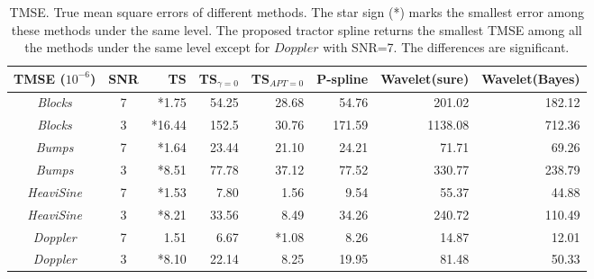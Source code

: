 \begin{table}
	\centering
	\caption{TMSE. True mean square errors of different methods. The star sign (*) marks the smallest error among these methods under the same level. The proposed tractor spline returns the smallest TMSE among all the methods under the same level except for $\mathit{Doppler}$ with SNR=7. The differences are significant. }\label{tmse3200}
	\setlength\tabcolsep{1.5pt}
	\begin{tabular}{|c|c|r|r|r|r|r|r|}
\hline	TMSE ($10^{-6}$)  & SNR & TS & TS$_{\gamma=0}$ & TS$_{APT=0}$  & P-spline & Wavelet(sure) & Wavelet(Bayes)\\ \hline
		\textit{Blocks}    & 7   &*1.75 & 54.25 &  28.68   & 54.76   & 201.02   & 182.12   \\ \hline
		\textit{Blocks}    & 3   & *16.44& 152.5 & 30.76  & 171.59   & 1138.08  & 712.36  \\ \hline
		\textit{Bumps}     & 7   &*1.64 & 23.44  & 21.10     & 24.21 & 71.71 & 69.26 \\ \hline
		\textit{Bumps}     & 3   &*8.51 & 77.78  &37.12     & 77.52 & 330.77 & 238.79 \\ \hline
		\textit{HeaviSine} & 7   &*1.53& 7.80  & 1.56     & 9.54   & 55.37  &44.88  \\ \hline
		\textit{HeaviSine} & 3   & *8.21& 33.56  & 8.49 & 34.26 & 240.72& 110.49\\ \hline
		\textit{Doppler}   & 7   & 1.51& 6.67 &  *1.08   &  8.26   & 14.87  & 12.01  \\ \hline
		\textit{Doppler}   & 3   & *8.10& 22.14  & 8.25   & 19.95    &81.48  &50.33   \\ \hline
	\end{tabular}	
\end{table}

